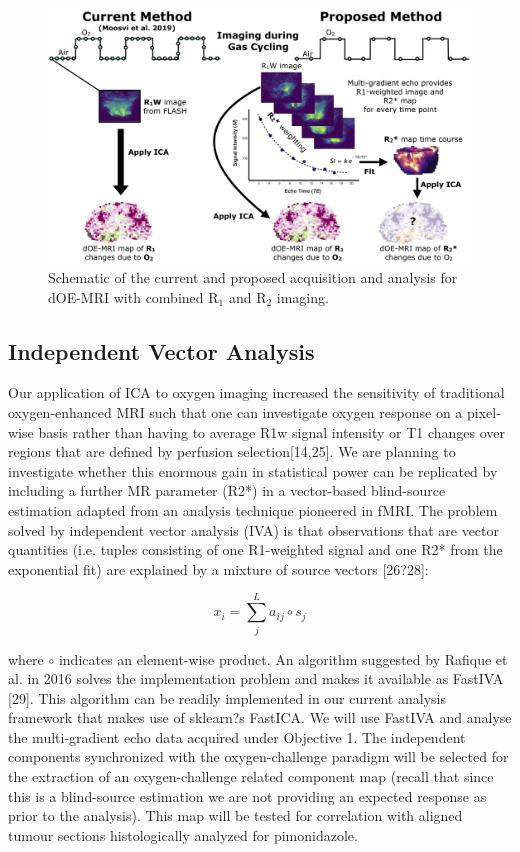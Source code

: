 \begin{figure}[htbp]
   \centering
   \includegraphics[width=\textwidth]{futurework/futurework-images/grantfig4_MGE_schematic.png} %
   \caption{Schematic of the current and proposed acquisition and analysis for \acs{dOE-MRI} with combined R$_1$ and R$_2$ imaging.
   \label{MGE_schematic}}
\end{figure}

\subsection{Independent Vector Analysis}

Our application of ICA to oxygen imaging increased the sensitivity of traditional oxygen-enhanced MRI such that one can investigate oxygen response on a pixel-wise basis rather than having to average R1w signal intensity or T1 changes over regions that are defined by perfusion selection[14,25]. We are planning to investigate whether this enormous gain in statistical power can be replicated by including a further MR parameter (R2*) in a vector-based blind-source estimation adapted from an analysis technique pioneered in fMRI. The problem solved by independent vector analysis (IVA) is that observations that are vector quantities (i.e. tuples consisting of one R1-weighted signal and one R2* from the exponential fit)  are explained by a mixture  of source vectors  [26?28]:

\begin{equation}
x_i = \sum_{j}^{L} a_{ij} \circ s_j
\end{equation}

where $\circ$ indicates an element-wise product. An algorithm suggested by Rafique et al. in 2016 solves the implementation problem and makes it available as FastIVA [29]. This algorithm can be readily implemented in our current analysis framework that makes use of sklearn?s FastICA. We will use FastIVA and analyse the multi-gradient echo data acquired under Objective 1. The independent components synchronized with the oxygen-challenge paradigm will be selected for the extraction of an oxygen-challenge related component map (recall that since this is a blind-source estimation we are not providing an expected response as prior to the analysis). This map will be tested for correlation with aligned tumour sections histologically analyzed for pimonidazole.

